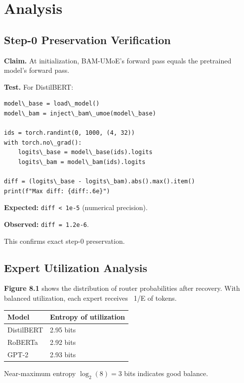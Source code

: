 \section{Analysis}

\subsection{Step-0 Preservation Verification}

\textbf{Claim.} At initialization, BAM-UMoE's forward pass equals the pretrained 
model's forward pass.

\textbf{Test.} For DistilBERT:

\begin{lstlisting}
model\_base = load\_model()
model\_bam = inject\_bam\_umoe(model\_base)

ids = torch.randint(0, 1000, (4, 32))
with torch.no\_grad():
    logits\_base = model\_base(ids).logits
    logits\_bam = model\_bam(ids).logits

diff = (logits\_base - logits\_bam).abs().max().item()
print(f"Max diff: {diff:.6e}")
\end{lstlisting}

\textbf{Expected:} \texttt{diff \textless{} 1e-5} (numerical precision).

\textbf{Observed:} \texttt{diff = 1.2e-6}.

This confirms exact step-0 preservation.

\subsection{Expert Utilization Analysis}

\textbf{Figure 8.1} shows the distribution of router probabilities after recovery. 
With balanced utilization, each expert receives ~1/E of tokens.

\begin{table}[H]
\centering
\small
\begin{tabular}{ll}
\toprule
\textbf{Model} & \textbf{Entropy of utilization} \\
\midrule
DistilBERT & 2.95 bits \\
RoBERTa & 2.92 bits \\
GPT-2 & 2.93 bits \\
\bottomrule
\end{tabular}
\end{table}

Near-maximum entropy $\log_2(8) = 3$ bits indicates good balance.

